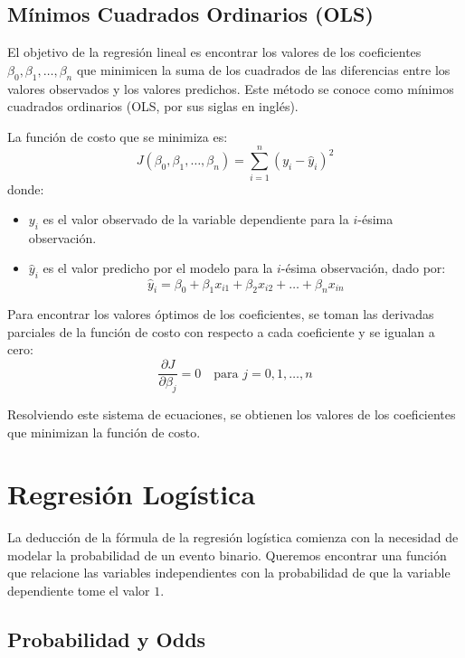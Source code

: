 \subsection*{Mínimos Cuadrados Ordinarios (OLS)}

El objetivo de la regresión lineal es encontrar los valores de los coeficientes $\beta_0, \beta_1, \ldots, \beta_n$ que minimicen la suma de los cuadrados de las diferencias entre los valores observados y los valores predichos. Este método se conoce como mínimos cuadrados ordinarios (OLS, por sus siglas en inglés).

La función de costo que se minimiza es:
\begin{equation}
J\left(\beta_0, \beta_1, \ldots, \beta_n\right) = \sum_{i=1}^{n}\left(y_i - \hat{y}_i\right)^2
\end{equation}
donde:
\begin{itemize}
    \item $y_i$ es el valor observado de la variable dependiente para la $i$-ésima observación.
    \item $\hat{y}_i$ es el valor predicho por el modelo para la $i$-ésima observación, dado por:
    \begin{equation}
    \hat{y}_i = \beta_0 + \beta_1 x_{i1} + \beta_2 x_{i2} + \ldots + \beta_n x_{in}
    \end{equation}
\end{itemize}

Para encontrar los valores óptimos de los coeficientes, se toman las derivadas parciales de la función de costo con respecto a cada coeficiente y se igualan a cero:
\begin{equation}
\frac{\partial J}{\partial \beta_j} = 0 \quad \text{para } j = 0, 1, \ldots, n
\end{equation}

Resolviendo este sistema de ecuaciones, se obtienen los valores de los coeficientes que minimizan la función de costo.

\section{Regresión Logística}

La deducción de la fórmula de la regresión logística comienza con la necesidad de modelar la probabilidad de un evento binario. Queremos encontrar una función que relacione las variables independientes con la probabilidad de que la variable dependiente tome el valor $1$.

\subsection*{Probabilidad y Odds}

